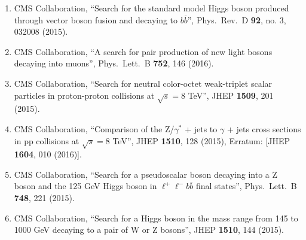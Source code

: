 \begin{itemize}
\begin{enumerate}
\item CMS Collaboration, ``Search for the standard model Higgs boson produced through vector boson fusion and decaying to $b \overline{b}$'', Phys.\ Rev.\ D {\bf 92}, no. 3, 032008 (2015).

\item CMS Collaboration, ``A search for pair production of new light bosons decaying into muons'', Phys.\ Lett.\ B {\bf 752}, 146 (2016).

\item CMS Collaboration, ``Search for neutral color-octet weak-triplet scalar particles in proton-proton collisions at $ \sqrt{s}=8 $ TeV'', JHEP {\bf 1509}, 201 (2015).

\item CMS Collaboration, ``Comparison of the Z/$\gamma$$^{*}$ + jets to $\gamma$ + jets cross sections in pp collisions at $ \sqrt{s}=8 $ TeV'', JHEP {\bf 1510}, 128 (2015), Erratum: [JHEP {\bf 1604}, 010 (2016)].

\item CMS Collaboration, ``Search for a pseudoscalar boson decaying into a Z boson and the 125 GeV Higgs boson in $\ell^+\ell^-b\overline{b}$ final states'', Phys.\ Lett.\ B {\bf 748}, 221 (2015).

\item CMS Collaboration, ``Search for a Higgs boson in the mass range from 145 to 1000 GeV decaying to a pair of W or Z bosons'', JHEP {\bf 1510}, 144 (2015).


\end{enumerate}
\end{itemize}
